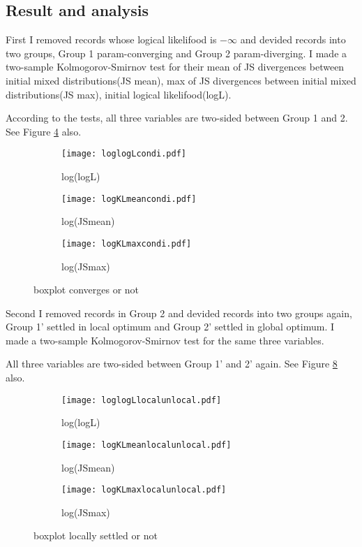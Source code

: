 \documentclass[uplatex]{jsarticle}
\begin{document}
    \subsection{Result and analysis}
      \indent
	First I removed records whose logical likelifood is $-\infty$ and devided records into two groups, Group 1 \textemdash param-converging and Group 2 \textemdash param-diverging. I made a two-sample Kolmogorov-Smirnov test for their mean of JS divergences between initial mixed distributions(JS mean), max of JS divergences between initial mixed distributions(JS max), initial logical likelifood(logL).
      \par
      \indent
	According to the tests, all three variables are two-sided between Group 1 and 2. See Figure \ref{fig:condi} also.
	\begin{figure}[h]
	\centering
	  \begin{subfigure}{0.32\columnwidth}
	  \centering
	  \texttt{[image: loglogLcondi.pdf]}
	  \caption{log(logL)}
	  \label{fig:loglogLcondi}
	  \end{subfigure}
	  \begin{subfigure}{0.32\columnwidth}
	  \centering
	  \texttt{[image: logKLmeancondi.pdf]}
	  \caption{log(JSmean)}
	  \label{fig:logJSmeancondi}
	  \end{subfigure}
	  \begin{subfigure}{0.32\columnwidth}
	  \centering
	  \texttt{[image: logKLmaxcondi.pdf]}
	  \caption{log(JSmax)}
	  \label{fig:logJSmaxcondi}
	  \end{subfigure}
	\caption{boxplot \textemdash converges or not}
	\label{fig:condi}
	\end{figure}
      \par
      \indent
	Second I removed records in Group 2 and devided records into two groups again, Group 1' \textemdash settled in local optimum and Group 2' \textemdash settled in global optimum. I made a two-sample Kolmogorov-Smirnov test for the same three variables.
      \par
      \indent
	All three variables are two-sided between Group 1' and 2' again. See Figure \ref{fig:localunlocal} also.
	\begin{figure}[h]
	\centering
	  \begin{subfigure}{0.32\columnwidth}
	  \centering
	  \texttt{[image: loglogLlocalunlocal.pdf]}
	  \caption{log(logL)}
	  \label{fig:loglogLlocalunlocal}
	  \end{subfigure}
	  \begin{subfigure}{0.32\columnwidth}
	  \centering
	  \texttt{[image: logKLmeanlocalunlocal.pdf]}
	  \caption{log(JSmean)}
	  \label{fig:logJSmeanlocalunlocal}
	  \end{subfigure}
	  \begin{subfigure}{0.32\columnwidth}
	  \centering
	  \texttt{[image: logKLmaxlocalunlocal.pdf]}
	  \caption{log(JSmax)}
	  \label{fig:logJSmaxlocalunlocal}
	  \end{subfigure}
	\caption{boxplot \textemdash locally settled or not}
	\label{fig:localunlocal}
	\end{figure}
\end{document}

